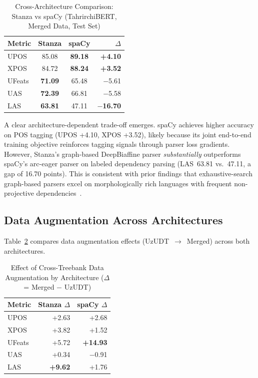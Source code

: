 \documentclass[10pt,conference,a4paper]{IEEEtran_EDM}
\begin{document}
\begin{table}[htbp]
\caption{Cross-Architecture Comparison: Stanza vs spaCy (TahrirchiBERT, Merged Data, Test Set)}
\begin{center}
\begin{tabular}{lccr}
\toprule
\textbf{Metric} & \textbf{Stanza} & \textbf{spaCy} & \textbf{$\Delta$} \\
\midrule
UPOS & 85.08 & \textbf{89.18} & \textbf{+4.10} \\
XPOS & 84.72 & \textbf{88.24} & \textbf{+3.52} \\
UFeats & \textbf{71.09} & 65.48 & $-$5.61 \\
UAS & \textbf{72.39} & 66.81 & $-$5.58 \\
LAS & \textbf{63.81} & 47.11 & $-$\textbf{16.70} \\
\bottomrule
\end{tabular}
\label{tab:cross_arch}
\end{center}
\end{table}

A clear architecture-dependent trade-off emerges. spaCy achieves higher accuracy on POS tagging (UPOS +4.10, XPOS +3.52), likely because its joint end-to-end training objective reinforces tagging signals through parser loss gradients. However, Stanza's graph-based DeepBiaffine parser \textit{substantially} outperforms spaCy's arc-eager parser on labeled dependency parsing (LAS~63.81 vs.\ 47.11, a gap of 16.70 points). This is consistent with prior findings that exhaustive-search graph-based parsers excel on morphologically rich languages with frequent non-projective dependencies~\cite{de2017raw}.

\subsection{Data Augmentation Across Architectures}

Table~\ref{tab:augmentation} compares data augmentation effects (UzUDT~$\to$~Merged) across both architectures.

\begin{table}[htbp]
\caption{Effect of Cross-Treebank Data Augmentation by Architecture ($\Delta$ = Merged $-$ UzUDT)}
\begin{center}
\begin{tabular}{lrr}
\toprule
\textbf{Metric} & \textbf{Stanza $\Delta$} & \textbf{spaCy $\Delta$} \\
\midrule
UPOS & +2.63 & +2.68 \\
XPOS & +3.82 & +1.52 \\
UFeats & +5.72 & \textbf{+14.93} \\
UAS & +0.34 & $-$0.91 \\
LAS & \textbf{+9.62} & +1.76 \\
\bottomrule
\end{tabular}
\label{tab:augmentation}
\end{center}
\end{table}
\end{document}

